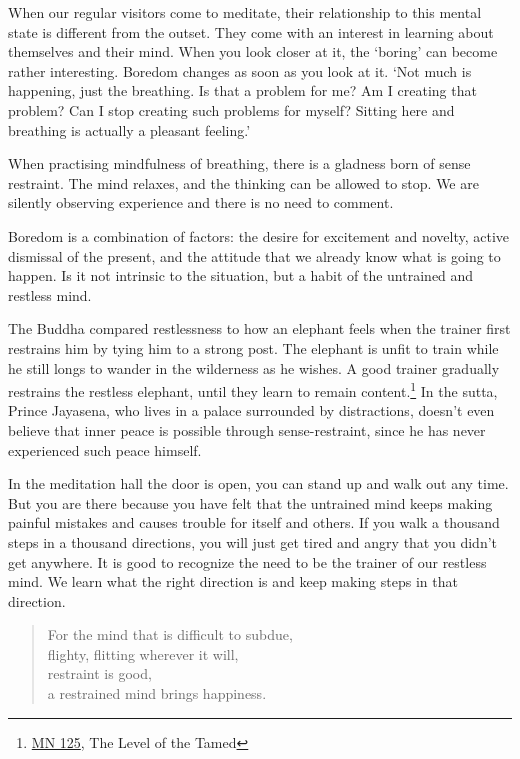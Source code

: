 When our regular visitors come to meditate, their relationship to this
mental state is different from the outset. They come with an interest in
learning about themselves and their mind. When you look closer at it,
the `boring' can become rather interesting. Boredom changes as soon as
you look at it. `Not much is happening, just the breathing. Is that a
problem for me? Am I creating that problem? Can I stop creating such
problems for myself? Sitting here and breathing is actually a pleasant
feeling.'

When practising mindfulness of breathing, there is a gladness born of
sense restraint. The mind relaxes, and the thinking can be allowed to
stop. We are silently observing experience and there is no need to
comment.

Boredom is a combination of factors: the desire for excitement and
novelty, active dismissal of the present, and the attitude that we
already know what is going to happen. Is it not intrinsic to the
situation, but a habit of the untrained and restless mind.

The Buddha compared restlessness to how an elephant feels when the
trainer first restrains him by tying him to a strong post. The elephant
is unfit to train while he still longs to wander in the wilderness as he
wishes. A good trainer gradually restrains the restless elephant, until
they learn to remain content.\footnote{\href{https://suttacentral.net/mn125}{MN
  125}, The Level of the Tamed} In the sutta, Prince Jayasena, who lives
in a palace surrounded by distractions, doesn't even believe that inner
peace is possible through sense-restraint, since he has never
experienced such peace himself.

\enlargethispage*{\baselineskip}

In the meditation hall the door is open, you can stand up and walk out
any time. But you are there because you have felt that the untrained
mind keeps making painful mistakes and causes trouble for itself and
others. If you walk a thousand steps in a thousand directions, you will
just get tired and angry that you didn't get anywhere. It is good to
recognize the need to be the trainer of our restless mind. We learn what
the right direction is and keep making steps in that direction.

\begin{quote}
For the mind that is difficult to subdue,\\
flighty, flitting wherever it will,\\
restraint is good,\\
a restrained mind brings happiness.

\bigskip

\end{quote}


